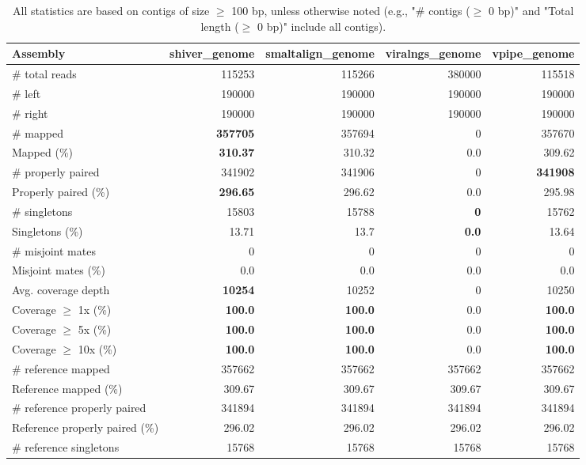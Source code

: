 \documentclass[12pt,a4paper]{article}
\begin{document}
\begin{table}[ht]
\begin{center}
\caption{All statistics are based on contigs of size $\geq$ 100 bp, unless otherwise noted (e.g., "\# contigs ($\geq$ 0 bp)" and "Total length ($\geq$ 0 bp)" include all contigs).}
\begin{tabular}{|l*{4}{|r}|}
\hline
Assembly & shiver\_genome & smaltalign\_genome & viralngs\_genome & vpipe\_genome \\ \hline
\# total reads & 115253 & 115266 & 380000 & 115518 \\ \hline
\# left & 190000 & 190000 & 190000 & 190000 \\ \hline
\# right & 190000 & 190000 & 190000 & 190000 \\ \hline
\# mapped & {\bf 357705} & 357694 & 0 & 357670 \\ \hline
Mapped (\%) & {\bf 310.37} & 310.32 & 0.0 & 309.62 \\ \hline
\# properly paired & 341902 & 341906 & 0 & {\bf 341908} \\ \hline
Properly paired (\%) & {\bf 296.65} & 296.62 & 0.0 & 295.98 \\ \hline
\# singletons & 15803 & 15788 & {\bf 0} & 15762 \\ \hline
Singletons (\%) & 13.71 & 13.7 & {\bf 0.0} & 13.64 \\ \hline
\# misjoint mates & 0 & 0 & 0 & 0 \\ \hline
Misjoint mates (\%) & 0.0 & 0.0 & 0.0 & 0.0 \\ \hline
Avg. coverage depth & {\bf 10254} & 10252 & 0 & 10250 \\ \hline
Coverage $\geq$ 1x (\%) & {\bf 100.0} & {\bf 100.0} & 0.0 & {\bf 100.0} \\ \hline
Coverage $\geq$ 5x (\%) & {\bf 100.0} & {\bf 100.0} & 0.0 & {\bf 100.0} \\ \hline
Coverage $\geq$ 10x (\%) & {\bf 100.0} & {\bf 100.0} & 0.0 & {\bf 100.0} \\ \hline
\# reference mapped & 357662 & 357662 & 357662 & 357662 \\ \hline
Reference mapped (\%) & 309.67 & 309.67 & 309.67 & 309.67 \\ \hline
\# reference properly paired & 341894 & 341894 & 341894 & 341894 \\ \hline
Reference properly paired (\%) & 296.02 & 296.02 & 296.02 & 296.02 \\ \hline
\# reference singletons & 15768 & 15768 & 15768 & 15768 \\ \hline

\end{tabular}
\end{center}
\end{table}
\end{document}
